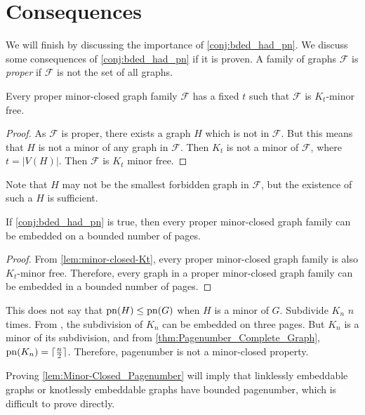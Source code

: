 \section{Consequences}
We will finish by discussing the importance of \cref{conj:bded_had_pn}. We discuss some consequences of \cref{conj:bded_had_pn} if it is proven. 
A family of graphs $\mathcal{F}$ is \textit{proper} if $\mathcal{F}$ is not the set of all graphs. 

\begin{lemma}\label{lem:minor-closed-Kt}
    Every proper minor-closed graph family $\mathcal{F}$ has a fixed $t$ such that $\mathcal{F}$ is $K_t$-minor free. 
\end{lemma}

\begin{proof}
    As $\mathcal{F}$ is proper, there exists a graph $H$ which is not in $\mathcal{F}$. But this means that $H$ is not a minor of any graph in $\mathcal{F}$. Then $K_t$ is not a minor of $\mathcal{F}$, where $t = |V(H)|$. Then $\mathcal{F}$ is $K_t$ minor free. 
\end{proof}
Note that $H$ may not be the smallest forbidden graph in $\mathcal{F}$, but the existence of such a $H$ is sufficient. 
\begin{lemma}\label{lem:Minor-Closed_Pagenumber}
    If \cref{conj:bded_had_pn} is true, then every proper minor-closed graph family can be embedded on a bounded number of pages.
\end{lemma}
\begin{proof}
    From \cref{lem:minor-closed-Kt}, every proper minor-closed graph family is also $K_t$-minor free. Therefore, every graph in a proper minor-closed graph family can be embedded in a bounded number of pages.
\end{proof}

This does not say that $\operatorname{pn}(H) \leq \operatorname{pn}(G)$ when $H$ is a minor of $G$. Subdivide $K_n$ $n$ times. From \textcite{atneosenEmbeddabilityCompactaNbooks}, the subdivision of $K_n$ can be embedded on three pages. But $K_n$ is a minor of its subdivision, and from \cref{thm:Pagenumber_Complete_Graph}, $\operatorname{pn}(K_n) = \lceil \frac{n}{2} \rceil$. Therefore, pagenumber is not a minor-closed property. 

Proving \cref{lem:Minor-Closed_Pagenumber} will imply that linklessly embeddable graphs or knotlessly embeddable graphs have bounded pagenumber, which is difficult to prove directly. 
